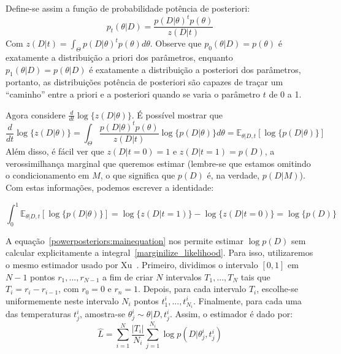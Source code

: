 \documentclass[12pt]{article}
\newcommand{\expectation}{\mathbb{E}}
\begin{document}
Define-se assim a função de probabilidade potência de posteriori:
\begin{equation}
    p_t (\theta | D) = \frac{p (D | \theta) ^ t p (\theta)}{z(D | t)}
\end{equation}
Com $z(D | t) = \int_{\Theta} p(D | \theta) ^ t p(\theta)d\theta$.
Observe que $p_0 (\theta | D) = p(\theta)$ é exatamente a distribuição 
a priori dos parâmetros, enquanto $p_1 (\theta | D) = p(\theta | D)$ é
exatamente a distribuição a posteriori dos parâmetros, portanto, as 
distribuições potência de posteriori são capazes de traçar um ``caminho''
entre a priori e a posteriori quando se varia o parâmetro $t$ de 0 a 1.

Agora considere $\frac{d}{dt} \log\{z (D|\theta)\}$. É possível mostrar
que 
\begin{equation}
\frac{d}{dt}\log \{z (D | \theta)\} = 
\int_{\Theta}\frac{p(D|\theta)^tp(\theta)}{z(D|t)}\log\{p(D|\theta)\}d\theta
=\expectation_{\theta | D, t}[\log\{p (D|\theta)\}]
\end{equation}
Além disso, é fácil ver que $z(D| t = 0) = 1$ e $z (D| t = 1) = 
p(D)$, a verossimilhança marginal que queremos estimar (lembre-se que 
estamos omitindo o condicionamento em $M$, o que significa que $p(D)$ é, 
na verdade, $p (D | M)$). Com estas informações, podemos escrever a 
identidade:

\begin{equation}\label{powerposteriors:mainequation}
    \int_0^1\expectation_{\theta | D, t}[\log\{p(D | \theta)\}] = 
        \log\{z(D | t = 1)\} - \log\{z (D | t = 0)\} = \log \{p (D)\} 
\end{equation}

A equação~\ref{powerposteriors:mainequation} nos permite estimar 
$\log {p (D)}$ sem calcular explicitamente a 
integral~\ref{marginilize_likelihood}. Para isso, utilizaremos o mesmo 
estimador usado por Xu~\cite{Xu2010}. Primeiro, dividimos o intervalo 
$[0, 1]$ em $N - 1$ pontos $r_1, ..., r_{N - 1}$ a fim de criar $N$ 
intervalos $T_1, ..., T_N$ tais que $T_i = r_i - r_{i - 1}$, com 
$r_0 = 0$ e $r_n = 1$. Depois, para cada intervalo $T_i$, escolhe-se 
uniformemente neste intervalo $N_i$ pontos $t^i_{1}, ..., t^i_{N_i}$. 
Finalmente, para cada uma das temperaturas $t^i_j$, amostra-se 
$\theta^i_j \sim \theta | D, t^i_j$. Assim, o estimador é dado por:
\begin{equation}\label{marginallikelihood_estimator}
    \hat{L} = \sum_{i = 1}^N \frac{|T_i|}{N_i} \sum_{j = 1}^{N_i} 
        \log {p (D | \theta^i_j, t^i_j)}
\end{equation}
\end{document}
